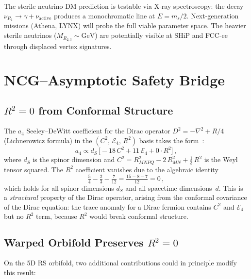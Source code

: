 The sterile neutrino DM prediction is testable via X-ray spectroscopy: the decay $\nu_{R_1} \to \gamma + \nu_{\mathrm{active}}$ produces a monochromatic line at $E = m_s/2$. Next-generation missions (Athena, LYNX) will probe the full viable parameter space. The heavier sterile neutrinos ($M_{R_{2,3}} \sim \mathrm{GeV}$) are potentially visible at SHiP and FCC-ee through displaced vertex signatures.


\section{NCG--Asymptotic Safety Bridge}
\label{sec:4-ncg-as}

\subsection{$R^2 = 0$ from Conformal Structure}
\label{sec:4-r2-zero}

The $a_4$ Seeley--DeWitt coefficient for the Dirac operator $D^2 = -\nabla^2 + R/4$ (Lichnerowicz formula) in the $(C^2,\, \mathcal{E}_4,\, R^2)$ basis takes the form~\cite{ch4:Vassilevich2003,ch4:Gilkey1984}:
\begin{equation}
  a_4 \propto d_S\, \bigl[-18\, C^2 + 11\, \mathcal{E}_4 + 0 \cdot R^2\bigr]\,,
  \label{eq:4-92}
\end{equation}
where $d_S$ is the spinor dimension and $C^2 = R_{MNPQ}^2 - 2\, R_{MN}^2 + \tfrac{1}{3}\, R^2$ is the Weyl tensor squared. The $R^2$ coefficient vanishes due to the algebraic identity
\begin{equation}
  \tfrac{5}{4} - \tfrac{2}{3} - \tfrac{7}{12} = \tfrac{15 - 8 - 7}{12} = 0\,,
  \label{eq:4-93}
\end{equation}
which holds for all spinor dimensions $d_S$ and all spacetime dimensions~$d$. This is a \emph{structural} property of the Dirac operator, arising from the conformal covariance of the Dirac equation: the trace anomaly for a Dirac fermion contains $C^2$ and $\mathcal{E}_4$ but no $R^2$ term, because $R^2$ would break conformal structure.

\subsection{Warped Orbifold Preserves $R^2 = 0$}
\label{sec:4-r2-warped}

On the 5D RS orbifold, two additional contributions could in principle modify this result:

